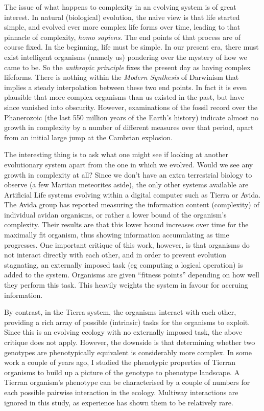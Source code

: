 The issue of what happens to complexity in an evolving system is of
great interest. In natural (biological) evolution, the naive view is
that life started simple, and evolved ever more complex life forms
over time, leading to that pinnacle of complexity, {\em homo
sapiens}. The end points of that process are of course fixed. In the
beginning, life must be simple. In our present era, there must exist
intelligent organisms (namely us) pondering over the mystery of how we
came to be. So the {\em anthropic principle} fixes the present day as
having complex lifeforms. There is nothing within the {\em Modern
Synthesis} of Darwinism that implies a steady interpolation between
these two end points. In fact it is even plausible that more complex
organisms than us existed in the past, but have since vanished into
obscurity. However, examinations of the fossil record over the
Phanerozoic (the last 550 million years of the Earth's history)
indicate almost no growth in complexity by a number of different
measures over that period, apart from an initial large jump at the
Cambrian explosion.\cite{McShea96}

The interesting thing is to ask what one might see if looking at
another evolutionary system apart from the one in which we
evolved. Would we see any growth in complexity at all? Since we don't
have an extra terrestrial biology to observe (a few Martian meteorites
aside), the only other systems available are Artificial Life systems
evolving within a digital computer such as Tierra or Avida. The Avida
group has reported measuring the information content (complexity) of
individual avidan organisms\cite{Adami98}, or rather a lower bound of
the organism's complexity. Their results are that this lower bound
increases over time for the maximally fit organism, thus showing
information accumulating as time progresses. One important critique of
this work, however, is that organisms do not interact directly with
each other, and in order to prevent evolution stagnating, an
externally imposed task (eg computing a logical operation) is added to
the system. Organisms are given ``fitness points'' depending on how
well they perform this task. This heavily weights the system in favour
for accruing information.

By contrast, in the Tierra system, the organisms interact with each
other, providing a rich array of possible (intrinsic) tasks for the
organisms to exploit. Since this is an evolving ecology with no
externally imposed task, the above critique does not
apply. However, the downside is that determining whether two genotypes
are phenotypically equivalent is considerably more complex. In some
work a couple of years ago\cite{Standish97b}, I studied the phenotypic
properties of Tierran organisms to build up a picture of the genotype
to phenotype landscape. A Tierran organism's phenotype can be 
characterised by a couple of numbers for each possible pairwise
interaction in the ecology. Multiway interactions are ignored in this
study, as experience has shown them to be relatively rare.


